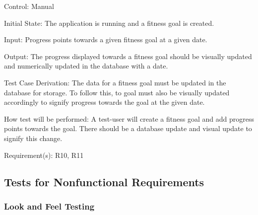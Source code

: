 \documentclass[12pt, titlepage]{article}
\begin{document}
\begin{enumerate}
		Control: Manual
		
		Initial State: The application is running and a fitness goal is created.
		
		Input: Progress points towards a given fitness goal at a given date.
		
		Output: The progress displayed towards a fitness goal should be visually updated and numerically updated in the database with a date.
		
		Test Case Derivation: The data for a fitness goal must be updated in the database for storage. To follow this, to goal must also be visually updated accordingly to signify progress towards the goal at the given date.
		
		How test will be performed: A test-user will create a fitness goal and add progress points towards the goal. There should be a database update and visual update to signify this change.
		
		Requirement(s): R10, R11
		
		
	\end{enumerate}

	
	\subsection{Tests for Nonfunctional Requirements}
	
	
	
	
	\subsubsection{Look and Feel Testing}
	
\end{document}

